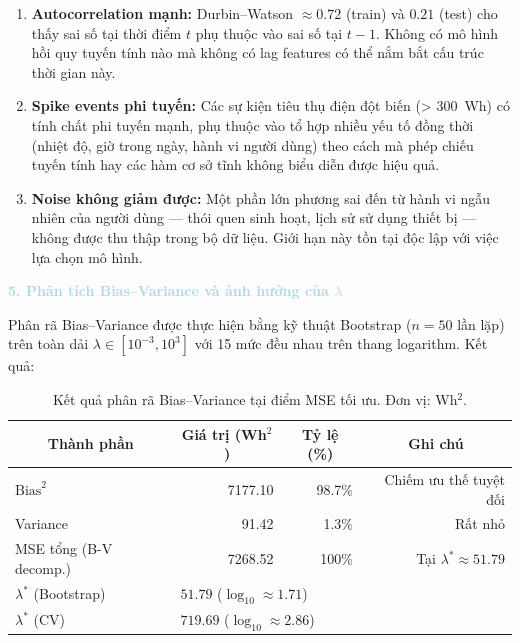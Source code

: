 \begin{enumerate}[labelsep=10pt, leftmargin=2cm]
    \item \textbf{Autocorrelation mạnh:} Durbin--Watson $\approx 0.72$ (train) và $0.21$
          (test) cho thấy sai số tại thời điểm $t$ phụ thuộc vào sai số tại $t-1$. Không
          có mô hình hồi quy tuyến tính nào mà không có lag features có thể nắm bắt cấu
          trúc thời gian này.

    \item \textbf{Spike events phi tuyến:} Các sự kiện tiêu thụ điện đột biến (> 300~Wh)
          có tính chất phi tuyến mạnh, phụ thuộc vào tổ hợp nhiều yếu tố đồng thời (nhiệt
          độ, giờ trong ngày, hành vi người dùng) theo cách mà phép chiếu tuyến tính hay
          các hàm cơ sở tĩnh không biểu diễn được hiệu quả.

    \item \textbf{Noise không giảm được:} Một phần lớn phương sai đến
          từ hành vi ngẫu nhiên của người dùng --- thói quen sinh hoạt, lịch sử sử dụng
          thiết bị --- không được thu thập trong bộ dữ liệu. Giới hạn này tồn tại độc lập
          với việc lựa chọn mô hình.
\end{enumerate}

\noindent\textcolor{lightblue}{\textbf{5. Phân tích Bias--Variance và ảnh hưởng của $\lambda$}}

Phân rã Bias--Variance được thực hiện bằng kỹ thuật Bootstrap ($n = 50$ lần lặp) trên toàn
dải $\lambda \in [10^{-3}, 10^3]$ với 15 mức đều nhau trên thang logarithm. Kết quả:


\captionsetup[table]{justification=centering}

\begin{table}[H]
\centering
\caption{Kết quả phân rã Bias--Variance tại điểm MSE tối ưu. Đơn vị: Wh$^2$.}
\label{tab:bias_variance_decomp}
\renewcommand{\arraystretch}{1.3}
\begin{tabular}{|l|r|r|r|}
    \hline
    \multicolumn{1}{|c|}{\textbf{Thành phần}} & \multicolumn{1}{c|}{\textbf{Giá trị (Wh$^2$)}} & \multicolumn{1}{c|}{\textbf{Tỷ lệ (\%)}} & \multicolumn{1}{c|}{\textbf{Ghi chú}} \\
    \hline
    $\text{Bias}^2$             & 7177.10 & 98.7\% & Chiếm ưu thế tuyệt đối \\
    Variance                    & 91.42   &  1.3\% & Rất nhỏ \\
    MSE tổng (B-V decomp.)      & 7268.52 & 100\%  & Tại $\lambda^* \approx 51.79$ \\
    \hline
    $\lambda^*$ (Bootstrap)     & \multicolumn{3}{l|}{$51.79$ \quad ($\log_{10} \approx 1.71$)} \\
    $\lambda^*$ (CV)            & \multicolumn{3}{l|}{$719.69$ \quad ($\log_{10} \approx 2.86$)} \\
    \hline
\end{tabular}
\end{table}

